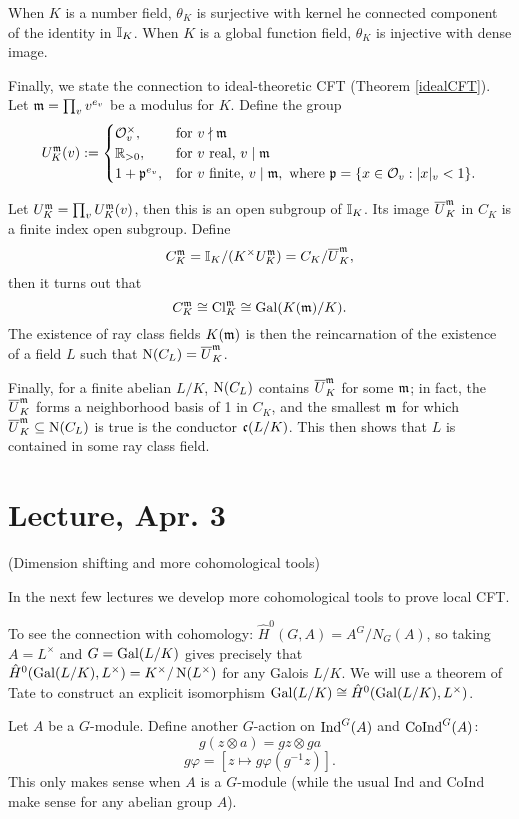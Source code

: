 \documentclass[11pt]{amsart}
\begin{document}
\begin{Rem}
    When $K$ is a number field, $\theta_K$ is surjective with kernel he connected component of the identity in $\mathbb{I}_K$. When $K$ is a global function field, $\theta_K$ is injective with dense image.
\end{Rem}


Finally, we state the connection to ideal-theoretic CFT (Theorem \ref{idealCFT}). Let $\mathfrak{m} = \prod_v v^{e_v}$ be a modulus for $K$. Define the group
\[U_K^{\mathfrak{m}}(v) :=
\begin{cases}
\mathcal{O}_v^\times, & \text{for } v\nmid \mathfrak{m} \\
\mathbb{R}_{>0}, & \text{for } v \text{ real, } v\mid \mathfrak{m} \\
1 + \mathfrak{p}^{e_v}, & \text{for } v \text{ finite, } v\mid \mathfrak{m}, \text{ where } \mathfrak{p} = \{x\in \mathcal{O}_v: |x|_v < 1\}.
\end{cases}\]

Let $U_K^{\mathfrak{m}} = \prod_v U_K^{\mathfrak{m}}(v)$, then this is an open subgroup of $\mathbb{I}_K$. Its image $\overline{U}_K^{\mathfrak{m}}$ in $C_K$ is a finite index open subgroup. Define
\[C_K^{\mathfrak{m}} = \mathbb{I}_K/(K^\times U_K^{\mathfrak{m}}) = C_K/\overline{U}_K^{\mathfrak{m}},\]
then it turns out that
\[C_K^{\mathfrak{m}}  \cong \operatorname{Cl}_K^{\mathfrak{m}} \cong \operatorname{Gal}(K(\mathfrak{m})/K).\]
The existence of ray class fields $K(\mathfrak{m})$ is then the reincarnation of the existence of a field $L$ such that $\operatorname{N}(C_{L}) = \overline{U}_K^{\mathfrak{m}}$. 

Finally, for a finite abelian $L/K$, $\operatorname{N}(C_L)$ contains $\overline{U}_K^{\mathfrak{m}}$ for some $\mathfrak{m}$; in fact, the $\overline{U}_K^{\mathfrak{m}}$ forms a neighborhood basis of 1 in $C_K$, and the smallest $\mathfrak{m}$ for which $\overline{U}_K^{\mathfrak{m}}\subseteq \operatorname{N}(C_L)$ is true is the conductor $\mathfrak{c}(L/K)$. This then shows that $L$ is contained in some ray class field.

\section{Lecture, Apr. 3}

(Dimension shifting and more cohomological tools)


In the next few lectures we develop more cohomological tools to prove local CFT.

To see the connection with cohomology: $\hat{H}^0(G,A) = A^G/N_G(A)$, so taking $A = L^\times$ and $G = \operatorname{Gal}(L/K)$ gives precisely that $\hat{H}^0(\operatorname{Gal}(L/K), L^\times) = K^\times/\operatorname{N}(L^\times)$ for any Galois $L/K$. We will use a theorem of Tate to construct an explicit isomorphism $\operatorname{Gal}(L/K)\cong \hat{H}^0(\operatorname{Gal}(L/K), L^\times)$.

\begin{defn}
    Let $A$ be a $G$-module. Define another $G$-action on $\operatorname{Ind}^G(A)$ and $\operatorname{CoInd}^G(A)$:
    \[g(z\otimes a) = gz\otimes ga\]
    \[g\varphi = [z\mapsto g\varphi(g^{-1}z)].\]
    This only makes sense when $A$ is a $G$-module (while the usual Ind and CoInd make sense for any abelian group $A$).
\end{defn}
\end{document}
